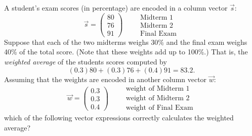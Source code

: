 \documentclass{ximera}
\author{Tae Eun Kim}
\begin{document}
\begin{exercise}
  A student's exam scores (in percentage) are encoded in a column vector $\vec{s}$:
  \[
    \vec{s} =
    \begin{pmatrix}
      80\\ 76\\ 91
    \end{pmatrix}
    \qquad
    \begin{array}{l}
      \text{Midterm 1}\\
      \text{Midterm 2}\\
      \text{Final Exam}
    \end{array}
  \]
  Suppose that each of the two midterms weighs 30\% and the final exam
  weighs 40\% of the total score. (Note that these weights add up to
  100\%.) That is, the \textit{weighted average} of the students
  scores computed by
  \[
    (0.3) 80 + (0.3) 76 + (0.4) 91 = 83.2.
  \]
  Assuming that the weights are encoded in another column vector $\vec{w}$:
  \[
    \vec{w} =
    \begin{pmatrix}
      0.3\\ 0.3\\ 0.4
    \end{pmatrix}
    \qquad
    \begin{array}{l}
      \text{weight of Midterm 1}\\
      \text{weight of Midterm 2}\\
      \text{weight of Final Exam}
    \end{array}
  \]
  which of the following vector expressions correctly calculates the
  weighted average?
  \begin{selectAll}
  \end{selectAll}
\end{exercise}
\end{document}
